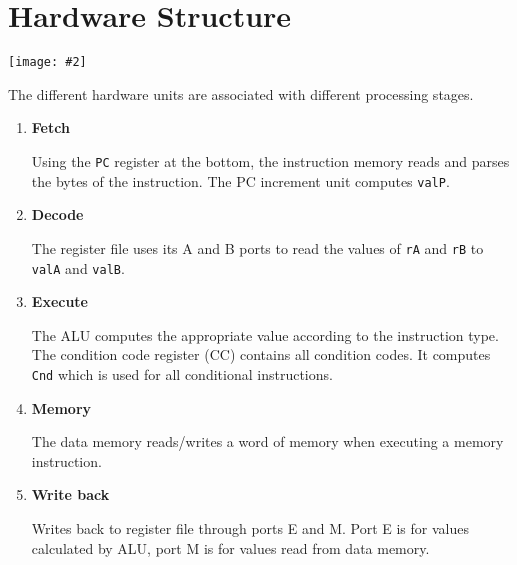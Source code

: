 \documentclass[a4paper]{article}
\newcommand{\code}[1]{\texttt{#1}}
\newcommand{\centerfig}[2]{\begin{center}\texttt{[image: \#2]}\end{center}}
\begin{document}
\section{Hardware Structure}

\centerfig{0.8}{seq-cpu.png}

The different hardware units are associated with different processing stages.

\begin{enumerate}
    \item \textbf{Fetch}
    
    Using the \code{PC} register at the bottom, the instruction memory reads and parses the bytes of the instruction. The PC increment unit computes \code{valP}.

    \item \textbf{Decode}
    
    The register file uses its A and B ports to read the values of \code{rA} and \code{rB} to \code{valA} and \code{valB}.

    \item \textbf{Execute}
    
    The ALU computes the appropriate value according to the instruction type. The condition code register (CC) contains all condition codes. It computes \code{Cnd} which is used for all conditional instructions.

    \item \textbf{Memory}
    
    The data memory reads/writes a word of memory when executing a memory instruction.

    \item \textbf{Write back}
    
    Writes back to register file through ports E and M. Port E is for values calculated by ALU, port M is for values read from data memory.

\end{enumerate}
\end{document}

